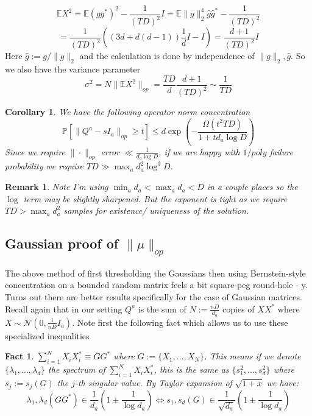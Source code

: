 \documentclass{article}
\newtheorem{corollary}[theorem]{Corollary}
\newtheorem{fact}[theorem]{Fact}
\newtheorem{remark}{Remark}
\newcommand{\E}{\mathbb{E}}
\renewcommand{\Pr}{\mathbb{P}}
\begin{document}
\[ \E X^{2} = \E (g g^{*})^{2} - \frac{1}{(TD)^{2}} I = \E \|g\|_{2}^{4} \hat{g} \hat{g}^{*} - \frac{1}{(TD)^{2}} \]
\[ = \frac{1}{(TD)^{2}} ( (3d + d(d-1)) \frac{1}{d} I - I ) = \frac{d+1}{(TD)^{2}} I   \]
Here $\hat{g} := g / \|g\|_{2}$ and the calculation is done by independence of $\|g\|_{2}, \hat{g}$. So we also have the variance parameter
\[ \sigma^{2} = N \|\E X^{2}\|_{op} = \frac{TD}{d} \frac{d+1}{(TD)^{2}} \sim \frac{1}{TD}  \]

\begin{corollary}
We have the following operator norm concentration
\[ \Pr[ \|Q^{a} - sI_{a}\|_{op} \geq t ] \leq d \exp \left( - \frac{\Omega(t^{2} TD)}{1 + t d_{a} \log D }  \right)  \]
Since we require $\|\cdot\|_{op}$ error $\ll \frac{1}{d_{a} \log D}$, if we are happy with $1/poly$ failure probability we require $TD \gg \max_{a} d_{a}^{2} \log^{3} D$.
\end{corollary}

\begin{remark} Note I'm using $\min_{a} d_{a} < \max_{a} d_{a} < D$ in a couple places so the $\log$ term may be slightly sharpened. But the exponent is tight as we require $TD > \max_{a} d_{a}^{2}$ samples for existence/ uniqueness of the solution.
\end{remark}


\subsection{Gaussian proof of $\|\mu\|_{op}$}
The above method of first thresholding the Gaussians then using Bernstein-style concentration on a bounded random matrix feels a bit square-peg round-hole - y. Turns out there are better results specifically for the case of Gaussian matrices. Recall again that in our setting $Q^{a}$ is the sum of $N := \frac{nD}{d_{a}}$ copies of $X X^{*}$ where $X \sim \mathcal{N}(0,\frac{1}{nD} I_{a})$. Note first the following fact which allows us to use these specialized inequalities

\begin{fact}
$\sum_{i=1}^{N} X_{i} X_{i}^{*} \equiv G G^{*} $ where $G := \{X_{1}, ..., X_{N}\}$.
This means if we denote $\{\lambda_{1}, ..., \lambda_{d}\}$ the spectrum of $\sum_{i=1}^{N} X_{i} X_{i}^{*}$, this is the same as $\{s_{1}^{2}, ..., s_{d}^{2}\}$ where $s_{j} := s_{j}(G)$ the $j$-th singular value. By Taylor expansion of $\sqrt{1+x}$ we have:
\[ \lambda_{1},\lambda_{d}(GG^{*}) \in \frac{1}{d_{a}} \left( 1 \pm \frac{1}{\log d_{a}} \right) \iff s_{1},s_{d}(G) \in  \frac{1}{\sqrt{d_{a}}} \left( 1 \pm \frac{1}{\log d_{a}} \right)  \]
\end{fact}
\end{document}
